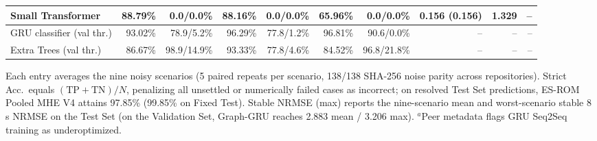 {\begin{table}[!t]
\begin{tabularx}{\textwidth}{@{}>{\raggedright\arraybackslash}Xrrrrrrrrr@{}}
Small Transformer             & 88.79\% & 0.0/0.0\%   & 88.16\% & 0.0/0.0\%  & 65.96\% & 0.0/0.0\%   & 0.156 (0.156) & 1.329 & --\\
\midrule
GRU classifier (val thr.)     & 93.02\% & 78.9/5.2\%  & 96.29\% & 77.8/1.2\% & 96.81\% & 90.6/0.0\%  & --            & --    & --\\
Extra Trees (val thr.)        & 86.67\% & 98.9/14.9\% & 93.33\% & 77.8/4.6\% & 84.52\% & 96.8/21.8\% & --            & --    & --\\
\bottomrule
\end{tabularx}
\par\smallskip
\parbox{\textwidth}{\footnotesize
Each entry averages the nine noisy scenarios (5 paired repeats per scenario,
138/138 SHA-256 noise parity across repositories). Strict Acc.\ equals
$(\mathrm{TP}+\mathrm{TN})/N$, penalizing all unsettled or numerically failed
cases as incorrect; on resolved Test Set predictions, ES-ROM Pooled MHE V4
attains 97.85\% (99.85\% on Fixed Test). Stable NRMSE (max) reports the
nine-scenario mean and worst-scenario stable 8\,s NRMSE on the Test Set
(on the Validation Set, Graph-GRU reaches 2.883 mean / 3.206 max).
$^{a}$Peer metadata flags GRU Seq2Seq training as underoptimized.}
\end{table}%
}

